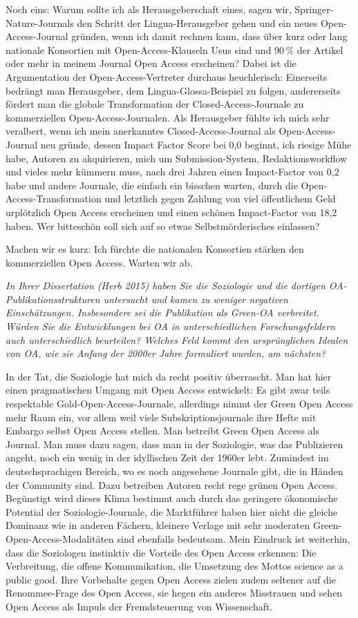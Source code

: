 \documentclass[a4paper,
fontsize=11pt,
oneside,
numbers=noperiodatend,
parskip=half-,
bibliography=totoc,
final
]{scrartcl}
\begin{document}
Noch eins: Warum sollte ich als Herausgeberschaft eines, sagen wir,
Springer-Nature-Journals den Schritt der Lingua-Herausgeber gehen und
ein neues Open-Access-Journal gründen, wenn ich damit rechnen kann, dass
über kurz oder lang nationale Konsortien mit Open-Access-Klauseln Usus
sind und 90\,\% der Artikel oder mehr in meinem Journal Open Access
erscheinen? Dabei ist die Argumentation der Open-Access-Vertreter
durchaus heuchlerisch: Einerseits bedrängt man Herausgeber, dem
Lingua-Glossa-Beispiel zu folgen, andererseits fördert man die globale
Transformation der Closed-Access-Journale zu kommerziellen
Open-Access-Journalen. Als Herausgeber fühlte ich mich sehr veralbert,
wenn ich mein anerkanntes Closed-Access-Journal als Open-Access-Journal
neu gründe, dessen Impact Factor Score bei 0,0 beginnt, ich riesige Mühe
habe, Autoren zu akquirieren, mich um Submission-System,
Redaktionsworkflow und vieles mehr kümmern muss, nach drei Jahren einen
Impact-Factor von 0,2 habe und andere Journale, die einfach ein bisschen
warten, durch die Open-Access-Transformation und letztlich gegen Zahlung
von viel öffentlichem Geld urplötzlich Open Access erscheinen und einen
schönen Impact-Factor von 18,2 haben. Wer bitteschön soll sich auf so
etwas Selbstmörderisches einlassen?

Machen wir es kurz: Ich fürchte die nationalen Konsortien stärken den
kommerziellen Open Access. Warten wir ab.

\emph{In Ihrer Dissertation (Herb 2015) haben Sie die Soziologie und die
dortigen OA-Publikationsstrukturen untersucht und kamen zu weniger
negativen Einschätzungen. Insbesondere sei die Publikation als Green-OA
verbreitet. Würden Sie die Entwicklungen bei OA in unterschiedlichen
Forschungsfeldern auch unterschiedlich beurteilen? Welches Feld kommt
den ursprünglichen Idealen von OA, wie sie Anfang der 2000er Jahre
formuliert wurden, am nächsten?}

In der Tat, die Soziologie hat mich da recht positiv überrascht. Man hat
hier einen pragmatischen Umgang mit Open Access entwickelt: Es gibt zwar
teils respektable Gold-Open-Access-Journale, allerdings nimmt der Green
Open Access mehr Raum ein, vor allem weil viele Subskriptionsjournale
ihre Hefte mit Embargo selbst Open Access stellen. Man betreibt Green
Open Access als Journal. Man muss dazu sagen, dass man in der
Soziologie, was das Publizieren angeht, noch ein wenig in der
idyllischen Zeit der 1960er lebt. Zumindest im deutschsprachigen
Bereich, wo es noch angesehene Journale gibt, die in Händen der
Community sind. Dazu betreiben Autoren recht rege grünen Open Access.
Begünstigt wird dieses Klima bestimmt auch durch das geringere
ökonomische Potential der Soziologie-Journale, die Marktführer haben
hier nicht die gleiche Dominanz wie in anderen Fächern, kleinere Verlage
mit sehr moderaten Green-Open-Access-Modalitäten sind ebenfalls
bedeutsam. Mein Eindruck ist weiterhin, dass die Soziologen instinktiv
die Vorteile des Open Access erkennen: Die Verbreitung, die offene
Kommunikation, die Umsetzung des Mottos science as a public good. Ihre
Vorbehalte gegen Open Access zielen zudem seltener auf die
Renommee-Frage des Open Access, sie hegen ein anderes Misstrauen und
sehen Open Access als Impuls der Fremdsteuerung von Wissenschaft.
\end{document}
